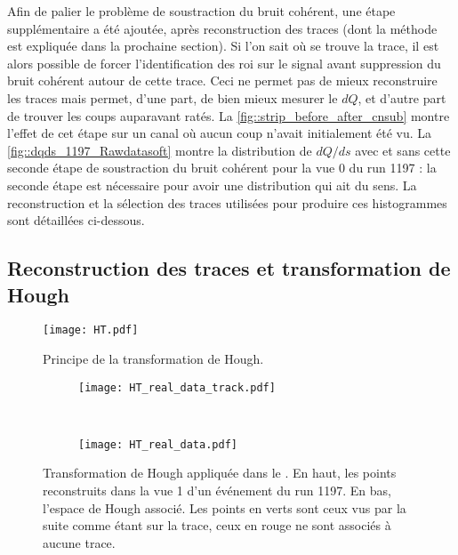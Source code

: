       Afin de palier le problème de soustraction du bruit cohérent, une étape supplémentaire a été ajoutée, après reconstruction des traces (dont la méthode est expliquée dans la prochaine section). Si l'on sait où se trouve la trace, il est alors possible de forcer l'identification des \gls{roi} sur le signal avant suppression du bruit cohérent autour de cette trace. Ceci ne permet pas de mieux reconstruire les traces mais permet, d'une part, de bien mieux mesurer le $dQ$, et d'autre part de trouver les coups auparavant ratés. La \autoref{fig::strip_before_after_cnsub} montre l'effet de cet étape sur un canal où aucun coup n'avait initialement été vu. La \autoref{fig::dqds_1197_Rawdatasoft} montre la distribution de $dQ/ds$ avec et sans cette seconde étape de soustraction du bruit cohérent pour la vue 0 du run 1197 : la seconde étape est nécessaire pour avoir une distribution qui ait du sens. La reconstruction et la sélection des traces utilisées pour produire ces histogrammes sont détaillées ci-dessous.

    \subsection{Reconstruction des traces et transformation de Hough}

      \begin{figure}[htbp]
        \centering
        \texttt{[image: HT.pdf]}
        \caption[Transformation de Hough]{\label{fig::HoughTransformation}Principe de la transformation de Hough.}
      \end{figure}

      \begin{figure}[htbp]
        \centering
        \begin{subfigure}[t]{0.8\textwidth}
          \centering
          \texttt{[image: HT\_real\_data\_track.pdf]}
        \end{subfigure}\\
        \begin{subfigure}[t]{0.48\textwidth}
          \centering
          \texttt{[image: HT\_real\_data.pdf]}
        \end{subfigure}
        \caption[Transformation de Hough dans le \TOO{}]{\label{fig::HT_real_data}Transformation de Hough appliquée dans le \TOO{}. En haut, les points reconstruits dans la vue 1 d'un événement du run 1197. En bas, l'espace de Hough associé. Les points en verts sont ceux vus par la suite comme étant sur la trace, ceux en rouge ne sont associés à aucune trace.}
      \end{figure}

